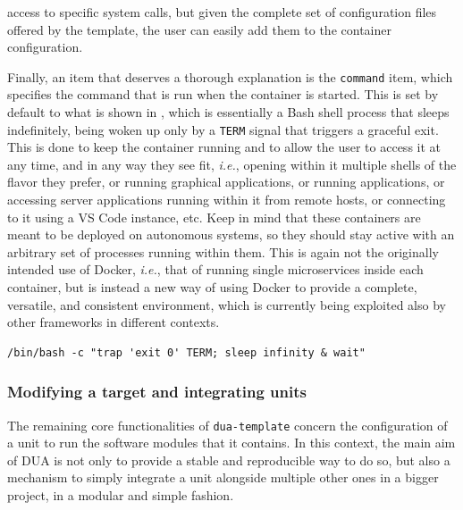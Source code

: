 access to specific system calls, but given the complete set of configuration files offered by the template, the user can easily add them to the container configuration.

Finally, an item that deserves a thorough explanation is the \texttt{command} item, which specifies the command that is run when the container is started. This is set by default to what is shown in , which is essentially a Bash shell process that sleeps indefinitely, being woken up only by a \texttt{TERM} signal that triggers a graceful exit. This is done to keep the container running and to allow the user to access it at any time, and in any way they see fit, \emph{i.e.}, opening within it multiple shells of the flavor they prefer, or running graphical applications, or running applications, or accessing server applications running within it from remote hosts, or connecting to it using a VS Code instance, etc. Keep in mind that these containers are meant to be deployed on autonomous systems, so they should stay active with an arbitrary set of processes running within them. This is again not the originally intended use of Docker, \emph{i.e.}, that of running single microservices inside each container, but is instead a new way of using Docker to provide a complete, versatile, and consistent environment, which is currently being exploited also by other frameworks in different contexts.
\begin{center}
\begin{minipage}[t]{.9\textwidth}
\begin{lstlisting}[caption=Default command of a DUA container: an idle shell process., label={lst:duacmd}]
/bin/bash -c "trap 'exit 0' TERM; sleep infinity & wait"
\end{lstlisting}
\end{minipage}
\end{center}

\subsubsection{Modifying a target and integrating units}
\label{sec:dua_template_configuration_modify}
The remaining core functionalities of \texttt{dua-template} concern the configuration of a unit to run the software modules that it contains. In this context, the main aim of DUA is not only to provide a stable and reproducible way to do so, but also a mechanism to simply integrate a unit alongside multiple other ones in a bigger project, in a modular and simple fashion.

